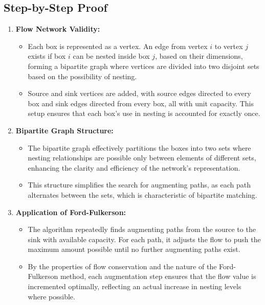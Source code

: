 \documentclass{article}
\begin{document}
    \subsection{Step-by-Step Proof}
        \begin{enumerate}
            \item \textbf{Flow Network Validity:}
            \begin{itemize}
                \item Each box is represented as a vertex. An edge from vertex \(i\) to vertex \(j\) exists if box \(i\) can be nested inside box \(j\), based on their dimensions, forming a bipartite graph where vertices are divided into two disjoint sets based on the possibility of nesting.
                \item Source and sink vertices are added, with source edges directed to every box and sink edges directed from every box, all with unit capacity. This setup ensures that each box's use in nesting is accounted for exactly once.
            \end{itemize}
        
            \item \textbf{Bipartite Graph Structure:}
            \begin{itemize}
                \item The bipartite graph effectively partitions the boxes into two sets where nesting relationships are possible only between elements of different sets, enhancing the clarity and efficiency of the network's representation.
                \item This structure simplifies the search for augmenting paths, as each path alternates between the sets, which is characteristic of bipartite matching.
            \end{itemize}
        
            \item \textbf{Application of Ford-Fulkerson:}
            \begin{itemize}
                \item The algorithm repeatedly finds augmenting paths from the source to the sink with available capacity. For each path, it adjusts the flow to push the maximum amount possible until no further augmenting paths exist.
                \item By the properties of flow conservation and the nature of the Ford-Fulkerson method, each augmentation step ensures that the flow value is incremented optimally, reflecting an actual increase in nesting levels where possible.
            \end{itemize}
        

\end{enumerate}
\end{document}
